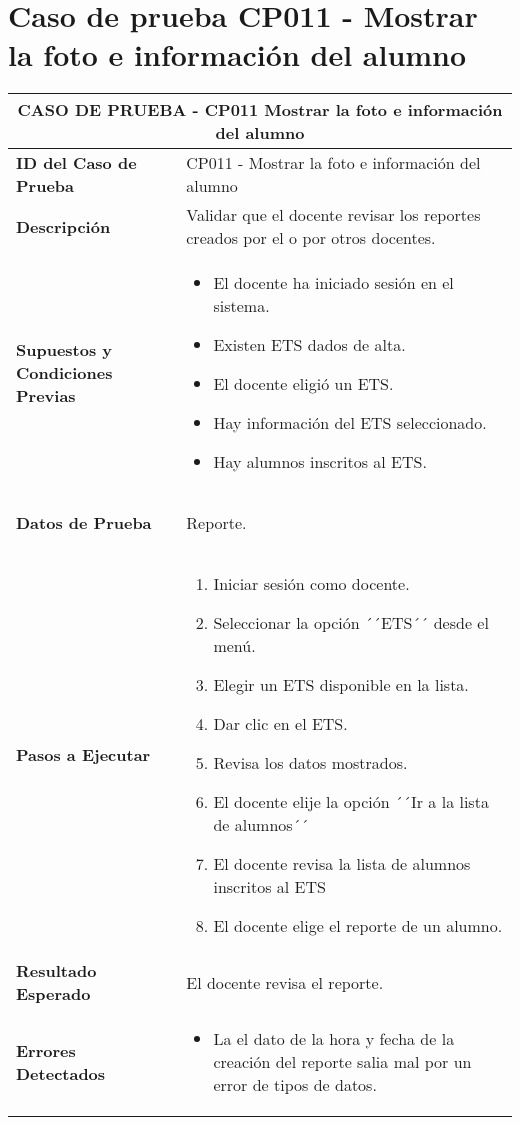 \section{Caso de prueba CP011 - Mostrar la foto e información del alumno}

\begin{longtable}{|p{5cm}|p{10cm}|}
	\hline
	\multicolumn{2}{|c|}{\textbf{CASO DE PRUEBA - CP011 Mostrar la foto e información del alumno}} \\
	\hline
	\textbf{ID del Caso de Prueba} & CP011 - Mostrar la foto e información del alumno \\
	\hline
	\textbf{Descripción} & Validar que el docente revisar los reportes creados por el o por otros docentes. \\
	\hline
	\textbf{Supuestos y Condiciones Previas} & 
	\begin{itemize}
		\item El docente ha iniciado sesión en el sistema.
		\item Existen ETS dados de alta.
		\item El docente eligió un ETS.
		\item Hay información del ETS seleccionado.
		\item Hay alumnos inscritos al ETS.
		
	\end{itemize} \\
	\hline
	\textbf{Datos de Prueba} & 
	\begin{itemize}
		Reporte. 
	\end{itemize} \\
	\hline
	\textbf{Pasos a Ejecutar} & 
	\begin{enumerate}
		\item Iniciar sesión como docente.
		\item Seleccionar la opción ´´ETS´´ desde el menú.
		\item Elegir un ETS disponible en la lista.
		\item Dar clic en el ETS.
		\item Revisa los datos mostrados.
		\item El docente elije la opción ´´Ir a la lista de alumnos´´
		\item El docente revisa la lista de alumnos inscritos al ETS
		\item El docente elige el reporte de un alumno.
	\end{enumerate} \\
	\hline
	\textbf{Resultado Esperado} & 
	El docente revisa el reporte. \\	
	\hline
	\textbf{Errores Detectados} & 
	\begin{itemize}
		\item La el dato de la hora y fecha de la creación del reporte salia mal por un error de tipos de datos.


\end{itemize}
\end{longtable}
